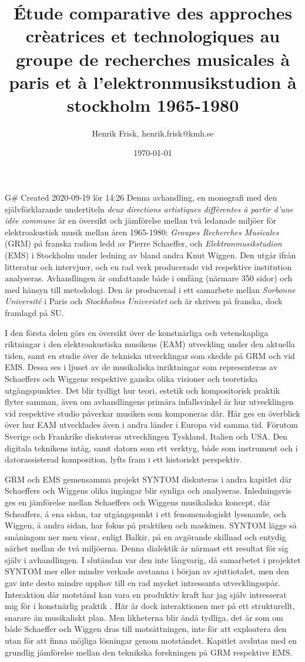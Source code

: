 \documentclass[11pt]{article}
\author{Henrik Frisk, henrik.frisk@kmh.se}
\date{\today}
\title{Étude comparative des approches crèatrices et technologiques au groupe de recherches musicales à paris et à l’elektronmusikstudion à stockholm 1965-1980}
\begin{document}
\maketitle
G\# Created 2020-09-19 lör 14:26
Denna avhandling, en monografi med den självförklarande undertiteln \emph{deux directions artistiques diffèrentes à partir d’une idèe commune} är en översikt och jämförelse mellan två ledanade miljöer för elektroakustisk musik mellan åren 1965-1980: \emph{Groupes Recherches Musicales} (GRM) på franska radion ledd av Pierre Schaeffer, och \emph{Elektronmusikstudion} (EMS) i Stockholm under ledning av bland andra Knut Wiggen. Den utgår ifrån litteratur och intervjuer, och en rad verk producerade vid respektive institution analyseras. Avhandlingen är omfattande både i omfång (närmare 350 sidor) och med hänsyn till metodologi. Den är producerad i ett samarbete mellan \emph{Sorbonne Université} i Paris och \emph{Stockholms Univeristet} och är skriven på franska, dock framlagd på SU.

I den första delen görs en översikt över de konstnärliga och vetenskapliga riktningar i den elektroakustiska musikens (EAM) utveckling under den aktuella tiden, samt en studie över de tekniska utvecklingar som skedde på GRM och vid EMS. Dessa ses i ljuset av de musikaliska inriktningar som representeras av Schaeffers och Wiggens respektive ganska olika visioner och teoretiska utgångspunkter. Det blir tydligt hur teori, estetik och kompositorisk praktik flyter samman, även om avhandlingens primära infallsvinkel är hur utvecklingen vid respektive studio påverkar musiken som komponeras där. Här ges en överblick över hur EAM utvecklades även i andra länder i Europa vid samma tid. Förutom Sverige och Frankrike diskuteras utvecklingen Tyskland, Italien och USA. Den digitala teknikens intåg, samt datorn som ett verktyg, både som instrument och i datorassisterad komposition, lyfts fram i ett historiskt perspektiv.

GRM och EMS gemensamma projekt SYNTOM diskuteras i andra kapitlet där Schaeffers och Wiggens olika ingångar blir synliga och analyseras. Inledningsvis ges en jämförelse mellan Schaeffers och Wiggens musikaliska koncept, där Scheaffers, å ena sidan, tar utgångspunkt i ett fenomenologiskt lyssnande, och Wiggen, å andra sidan, har fokus på praktiken och maskinen. SYNTOM läggs så småningom ner men visar, enligt Balkir, på en avgörande skillnad och entydig närhet mellan de två miljöerna. Denna dialektik är närmast ett resultat för sig själv i avhandlingen. I slutändan var den inte långvarig, då samarbetet i projektet SYNTOM mer eller mindre verkade avstanna i början av sjuttiotalet, men den gav inte desto mindre upphov till en rad mycket intressanta utvecklingsspår. Interaktion där motstånd kan vara en produktiv kraft har jag själv intresserat mig för i konstnärlig praktik \citep[Inte minst i min avhandling][]{frisk08phd}. Här är dock interaktionen mer på ett strukturellt, snarare än musikaliskt plan. Men likheterna blir ändå tydliga, det är som om både Schaeffer och Wiggen dras till motsättningen, inte för att exploatera den utan för att finna möjliga lösningar genom motståndet.
Kapitlet avslutas med en grundlig jämförelse mellan den teknikska forskningen på GRM respektive EMS.
\end{document}
